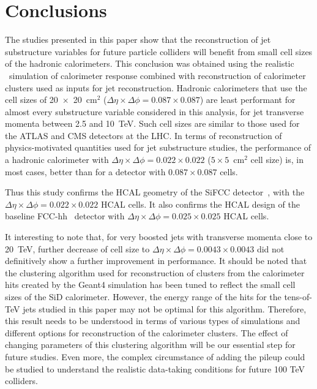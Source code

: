 \section{Conclusions}
The studies presented in this paper show that the reconstruction of jet substructure 
variables for future particle colliders will benefit from small cell sizes of the hadronic calorimeters. 
This conclusion was obtained using the realistic \GEANTfour\ simulation of calorimeter response combined with reconstruction of 
calorimeter clusters used as inputs for jet reconstruction. 
Hadronic calorimeters that use the cell sizes of 20~$\times $~20~cm$^2$ ($\Delta \eta \times \Delta \phi = 0.087\times 0.087$) 
are least performant for almost every 
substructure variable considered in this analysis, for jet transverse momenta between 2.5 and 10~TeV. 
Such cell sizes are similar to 
those used for the ATLAS and CMS detectors at the LHC. 
In terms of reconstruction of physics-motivated quantities  
used for jet substructure studies, the  performance 
of a  hadronic calorimeter  with 
$\Delta \eta \times \Delta \phi = 0.022\times0.022$ ($5 \times 5$~$\mathrm{cm}^2$ cell size) is, in most cases,
better than for a detector with  $0.087\times 0.087$ cells.

Thus this study confirms the  HCAL geometry of the SiFCC detector~\cite{Chekanov:2016ppq},
with the $\Delta \eta \times \Delta \phi = 0.022\times0.022$ HCAL cells.
It also confirms the HCAL design of the baseline FCC-hh~\cite{fcc1,fcc2} detector with
$\Delta \eta \times \Delta \phi = 0.025\times0.025$ HCAL cells.

It interesting to note that,  for very boosted jets with transverse momenta close to 20~TeV, further decrease of cell size to $\Delta \eta \times \Delta \phi = 0.0043\times0.0043$ did not 
 definitively show a further improvement in performance. It should be noted that the clustering algorithm used for reconstruction
of clusters from the calorimeter hits created by the Geant4 simulation 
has been tuned to reflect the small cell sizes of the SiD calorimeter. 
However, the energy range of the hits for the tens-of-TeV jets studied 
in this paper may not be optimal for this algorithm. Therefore, this 
result needs to be understood in terms of various types of simulations 
and different options for reconstruction of the calorimeter clusters. 
The effect of changing parameters of this clustering algorithm will be 
our essential step for future studies. Even more, the complex 
circumstance of adding the pileup could be studied to understand the 
realistic data-taking  conditions for future 100 TeV colliders.

